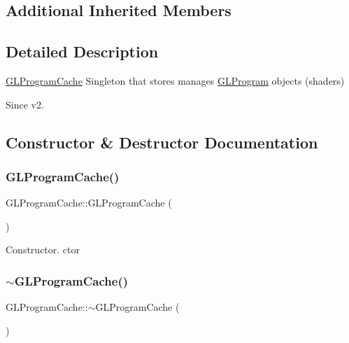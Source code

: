 \subsection*{Additional Inherited Members}


\subsection{Detailed Description}
\hyperlink{classGLProgramCache}{G\+L\+Program\+Cache} Singleton that stores manages \hyperlink{classGLProgram}{G\+L\+Program} objects (shaders) \begin{DoxySince}{Since}
v2. 
\end{DoxySince}


\subsection{Constructor \& Destructor Documentation}
\mbox{\label{classGLProgramCache_a6a4da5461d3f7d0dee493a1b7ccf6261}} 
\subsubsection{\texorpdfstring{G\+L\+Program\+Cache()}{GLProgramCache()}\hspace{0.1cm}{\footnotesize\ttfamily [1/2]}}
{\footnotesize\ttfamily G\+L\+Program\+Cache\+::\+G\+L\+Program\+Cache (\begin{DoxyParamCaption}{ }\end{DoxyParamCaption})}

Constructor.  ctor \mbox{\label{classGLProgramCache_a2374ee8aab9567f68aa52ab35301db45}} 
\subsubsection{\texorpdfstring{$\sim$\+G\+L\+Program\+Cache()}{~GLProgramCache()}\hspace{0.1cm}{\footnotesize\ttfamily [1/2]}}
{\footnotesize\ttfamily G\+L\+Program\+Cache\+::$\sim$\+G\+L\+Program\+Cache (\begin{DoxyParamCaption}{ }\end{DoxyParamCaption})}

